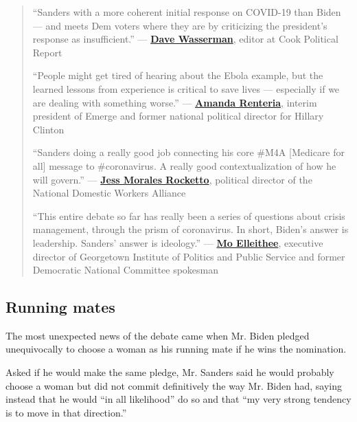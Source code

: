 \begin{quote}
``Sanders with a more coherent initial response on COVID-19 than Biden
--- and meets Dem voters where they are by criticizing the president's
response as insufficient.'' ---
\textbf{\href{https://twitter.com/Redistrict/status/1239342811578802176}{Dave
Wasserman}}, editor at Cook Political Report

``People might get tired of hearing about the Ebola example, but the
learned lessons from experience is critical to save lives --- especially
if we are dealing with something worse.'' ---
\textbf{\href{https://twitter.com/AmandaRenteria/status/1239345713831542784}{Amanda
Renteria}}, interim president of Emerge and former national political
director for Hillary Clinton

``Sanders doing a really good job connecting his core \#M4A {[}Medicare
for all{]} message to \#coronavirus. A really good contextualization of
how he will govern.'' ---
\textbf{\href{https://twitter.com/JessLivMo/status/1239348017288839175}{Jess
Morales Rocketto}}, political director of the National Domestic Workers
Alliance

``This entire debate so far has really been a series of questions about
crisis management, through the prism of coronavirus. In short, Biden's
answer is leadership. Sanders' answer is ideology.'' ---
\textbf{\href{https://twitter.com/MoElleithee/status/1239349995675017217}{Mo
Elleithee}}, executive director of Georgetown Institute of Politics and
Public Service and former Democratic National Committee spokesman
\end{quote}

\hypertarget{running-mates}{%
\subsection{Running mates}\label{running-mates}}

The most unexpected news of the debate came when Mr. Biden pledged
unequivocally to choose a woman as his running mate if he wins the
nomination.

Asked if he would make the same pledge, Mr. Sanders said he would
probably choose a woman but did not commit definitively the way Mr.
Biden had, saying instead that he would ``in all likelihood'' do so and
that ``my very strong tendency is to move in that direction.''

